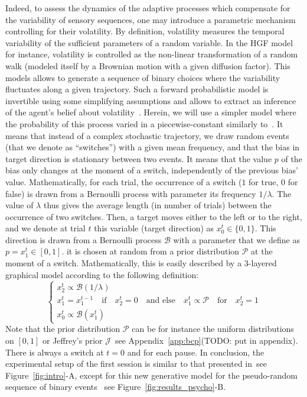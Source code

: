 \documentclass[profile,final,english, draft]{article}%
\newcommand{\choice}[1]{ %
	\left\{ %
		\begin{array}{l} #1 \end{array} %
	\right. }
\newcommand{\eql}[1]{\begin{equation}#1\end{equation}}
\newcommand{\Bb}{\mathcal{B}}
\newcommand{\Jj}{\mathcal{J}}
\newcommand{\Pp}{\mathcal{P}}
\newcommand{\citep}[1]{\parencite{#1}}
\newcommand{\citet}[1]{\textcite{#1}}
\newcommand{\seeFig}[1]{see Figure~\ref{fig:#1}}
\newcommand{\seeApp}[1]{see Appendix~\ref{app:#1}}
\begin{document}
Indeed, to assess the dynamics of the adaptive processes
which compensate for the variability of sensory sequences,
one may introduce a parametric mechanism controlling for their volatility.
By definition, volatility measures the temporal variability
of the sufficient parameters of a random variable.
In the HGF model~\citep{Matthys2011} for instance,
volatility is controlled as the non-linear transformation
of a random walk (modeled itself by a Brownian motion with a given diffusion factor).
This models allows to generate a sequence of binary choices
where the variability fluctuates along a given trajectory.
Such a forward probabilistic model is invertible
using some simplifying assumptions and allows
to extract an inference of the agent's belief about volatility~\citep{Voessel??}.
Herein, we will use a simpler model where
the probability of this process varied in a piecewise-constant
similarly to~\citet{Meyniel13}.
It means that instead of a complex stochastic trajectory, 
we draw random events (that we denote as ``switches'')
with a given mean frequency,
and that the bias in target direction is stationary between two events.
It means that the value $p$ of the bias only changes at the moment of a switch,
independently of the previous bias' value.
Mathematically, for each trial, 
the occurrence of a switch ($1$ for true, $0$ for false)
is  drawn from a Bernoulli process with parameter its frequency $1/\lambda$.
The value of $\lambda$ thus gives the average length (in number of trials) 
between the occurrence of two switches.
Then, a target moves either to the left or to the right,
and we denote at trial $t$ this variable (target direction) as $x_0^t\in \{ 0, 1 \}$.
This direction is drawn from a Bernoulli process $\Bb$
with a parameter that we define as $p=x_1^t \in [0, 1]$.
it is chosen at random from a prior distribution $\Pp$ at the moment of a switch.
Mathematically, this is easily described
by a 3-layered graphical model according to %
the following definition:
\eql{\choice{
x_2^t \propto \Bb(1/\lambda) \\
x_1^t = x_1^{t-1} \quad \text{if} \quad x_2^t=0 \quad \text{and else} \quad x_1^t \propto \Pp \quad \text{for} \quad x_2^t=1 \\
x_0^t \propto \Bb(x_1^t)
}\label{eq:sgm}}
Note that the prior distribution $\Pp$ can be for instance
the uniform distributions on $ [ 0, 1 ] $ or
Jeffrey's prior $\Jj$~\seeApp{bcp}(TODO: put in appendix).
There is always a switch at $t=0$ and for each pause.
In conclusion, the experimental setup of the first session
is similar to that presented in~\seeFig{intro}-A, except for
this new generative model for the pseudo-random sequence of binary events
~\seeFig{results_psycho}-B.
\end{document}
